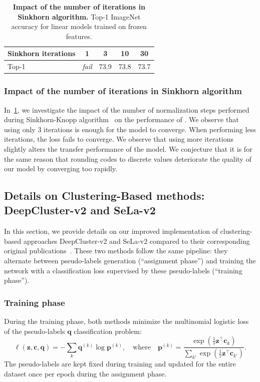 \begin{table}[b]
\centering
  \caption{
\textbf{Impact of the number of iterations in Sinkhorn algorithm.} Top-1 ImageNet accuracy for linear models trained on frozen features.
}
\vspace{.3em}
\begin{tabular}{l c c c c}
    \toprule
	Sinkhorn iterations & 1 & 3 & 10 & 30 \\
    \midrule
	Top-1 & \textit{fail} & 73.9 & 73.8 & 73.7 \\
    \bottomrule
  \end{tabular}
  \label{tab:iters}
\end{table}

\subsubsection{Impact of the number of iterations in Sinkhorn algorithm}
In~\cref{tab:iters}, we investigate the impact of the number of normalization steps performed during Sinkhorn-Knopp algorithm~\cite{cuturi2013sinkhorn} on the performance of \OURS.
We observe that using only $3$ iterations is enough for the model to converge.
When performing less iterations, the loss fails to converge.
We observe that using more iterations slightly alters the transfer performance of the model.
We conjecture that it is for the same reason that rounding codes to discrete values deteriorate the quality of our model by converging too rapidly.

\subsection{Details on Clustering-Based methods: DeepCluster-v2 and SeLa-v2}
\label{ap:clustering}
In this section, we provide details on our improved implementation of clustering-based approaches DeepCluster-v2 and SeLa-v2 compared to their corresponding original publications~\cite{caron2018deep,asano2019self}.
These two methods follow the same pipeline: they alternate between pseudo-labels generation (``assignment phase'') and training the network with a classification loss supervised by these pseudo-labels (``training phase'').

\subsubsection{Training phase}
During the training phase, both methods minimize the multinomial logistic loss of the pseudo-labels $\mathbf{q}$ classification problem:
\begin{equation}
  \ell(\mathbf{z}, \mathbf{c}, \mathbf{q}) = - \sum_{k} \mathbf{q}^{(k)} \log \mathbf{p}^{(k)}, \quad \text{where} \quad \mathbf{p}^{(k)} = \frac{ \exp \left ( \frac{1}{\tau} \mathbf{z}^\top \mathbf{c}_k \right ) }{\sum_{k'} \exp \left ( \frac{1}{\tau} \mathbf{z}^\top \mathbf{c}_{k'} \right ) }.
  \label{eq:ap_assignloss}
\end{equation}
The pseudo-labels are kept fixed during training and updated for the entire dataset once per epoch during the assignment phase.

